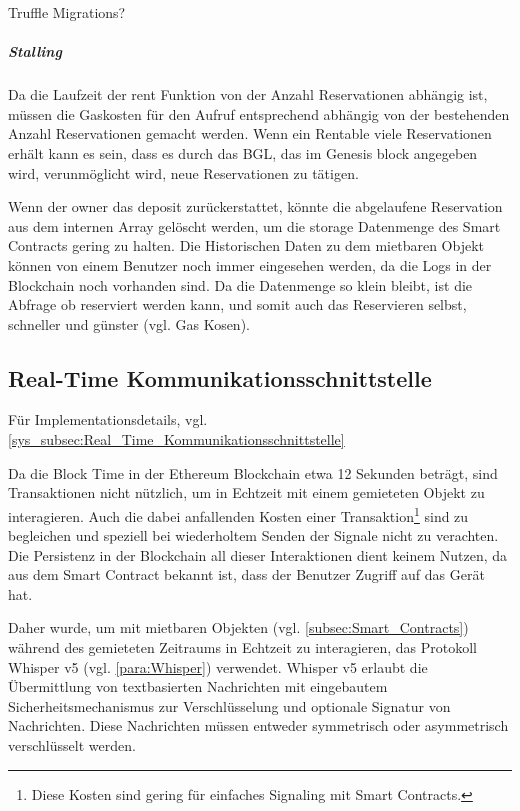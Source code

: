 Truffle Migrations?

\subparagraph{Stalling}
\label{subpara:Stalling}
Da die Laufzeit der rent Funktion von der Anzahl Reservationen abhängig ist, müssen die Gaskosten für den Aufruf entsprechend abhängig von der bestehenden Anzahl Reservationen gemacht werden. Wenn ein Rentable viele Reservationen erhält kann es sein, dass es durch das \acrfull{BGL}, das im Genesis block angegeben wird, verunmöglicht wird, neue Reservationen zu tätigen.\cite[Security Considerations/Gas Limit and Loops]{solidity.readthedocs.io}\cite{media.consensys.net/gas-and-fuel}

Wenn der owner das deposit zurückerstattet, könnte die abgelaufene Reservation aus dem internen Array gelöscht werden, um die storage Datenmenge des Smart Contracts gering zu halten. Die Historischen Daten zu dem mietbaren Objekt können von einem Benutzer noch immer eingesehen werden, da die Logs in der Blockchain noch vorhanden sind. Da die Datenmenge so klein bleibt, ist die Abfrage ob reserviert werden kann, und somit auch das Reservieren selbst, schneller und günster (vgl. Gas Kosen).

\subsection{Real-Time Kommunikationsschnittstelle}
\label{subsec:Real_Time_Kommunikationsschnittstelle}
Für Implementationsdetails, vgl. \ref{sys_subsec:Real_Time_Kommunikationsschnittstelle}

Da die Block Time in der Ethereum Blockchain etwa 12 Sekunden beträgt, sind Transaktionen nicht nützlich, um in Echtzeit mit einem gemieteten Objekt zu interagieren. Auch die dabei anfallenden Kosten einer Transaktion\footnote{Diese Kosten sind gering für einfaches Signaling mit Smart Contracts.} sind zu begleichen und speziell bei wiederholtem Senden der Signale nicht zu verachten. Die Persistenz in der Blockchain all dieser Interaktionen dient keinem Nutzen, da aus dem Smart Contract bekannt ist, dass der Benutzer Zugriff auf das Gerät hat. \cite{blog.ethereum.org/block-time}

Daher wurde, um mit mietbaren Objekten (vgl. \ref{subsec:Smart_Contracts}) während des gemieteten Zeitraums in Echtzeit zu interagieren, das Protokoll Whisper v5 (vgl. \ref{para:Whisper}) verwendet. Whisper v5 erlaubt die Übermittlung von textbasierten Nachrichten mit eingebautem Sicherheitsmechanismus zur Verschlüsselung und optionale Signatur von Nachrichten. Diese Nachrichten müssen entweder symmetrisch oder asymmetrisch verschlüsselt werden.\cite[Wiki/Whisper Usage]{go-ethereum}

